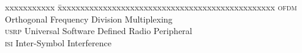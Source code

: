 \abbreviations

\noindent
\begin{tabbing}
	xxxxxxxxxxx \= xxxxxxxxxxxxxxxxxxxxxxxxxxxxxxxxxxxxxxxxxxxxxxxx \kill
	\textsc{ofdm} \> Orthogonal Frequency Division Multiplexing \\
	\textsc{usrp} \> Universal Software Defined Radio Peripheral \\
	\textsc{isi}  \> Inter-Symbol Interference \\
\end{tabbing}
